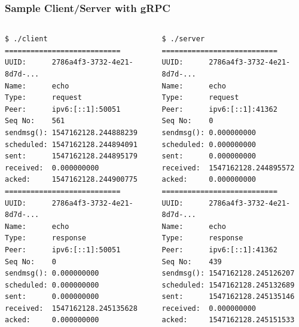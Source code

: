 \documentclass[10pt]{beamer}
\begin{document}
\begin{frame}[fragile]
\frametitle{Sample Client/Server with gRPC}
\begin{columns}[c]
\begin{block}{}
      {\scriptsize
      \begin{verbatim}
$ ./client
===========================
UUID:      2786a4f3-3732-4e21-8d7d-...
Name:      echo
Type:      request
Peer:      ipv6:[::1]:50051
Seq No:    561
sendmsg(): 1547162128.244888239
scheduled: 1547162128.244894091
sent:      1547162128.244895179
received:  0.000000000
acked:     1547162128.244900775
===========================
UUID:      2786a4f3-3732-4e21-8d7d-...
Name:      echo
Type:      response
Peer:      ipv6:[::1]:50051
Seq No:    0
sendmsg(): 0.000000000
scheduled: 0.000000000
sent:      0.000000000
received:  1547162128.245135628
acked:     0.000000000\end{verbatim}
      }
\end{block}

\begin{block}{}
      {\scriptsize
      \begin{verbatim}
$ ./server
===========================
UUID:      2786a4f3-3732-4e21-8d7d-...
Name:      echo
Type:      request
Peer:      ipv6:[::1]:41362
Seq No:    0
sendmsg(): 0.000000000
scheduled: 0.000000000
sent:      0.000000000
received:  1547162128.244895572
acked:     0.000000000
===========================
UUID:      2786a4f3-3732-4e21-8d7d-...
Name:      echo
Type:      response
Peer:      ipv6:[::1]:41362
Seq No:    439
sendmsg(): 1547162128.245126207
scheduled: 1547162128.245132689
sent:      1547162128.245135146
received:  0.000000000
acked:     1547162128.245151533\end{verbatim}
      }
\end{block}
\end{columns}
\end{frame}
\end{document}
